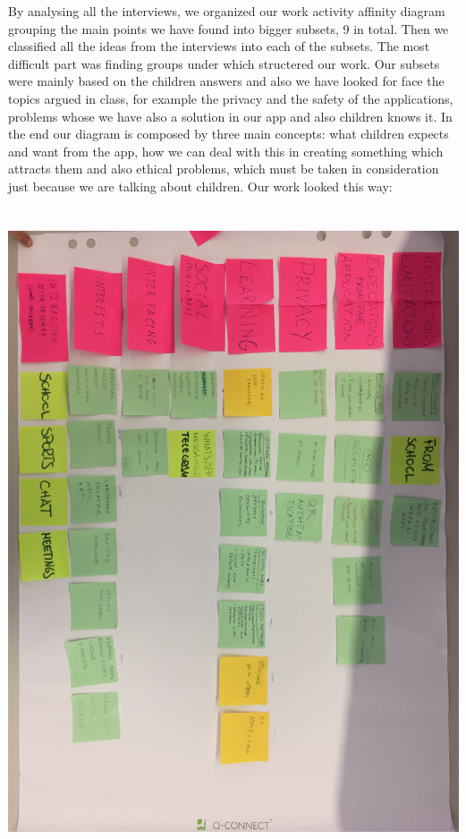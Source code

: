 \documentclass[12pt]{report}
\begin{document}
	By analysing all the interviews, we organized our work activity affinity diagram grouping the main points
	we have found into bigger subsets, 9 in total. Then we classified all the ideas
	from the interviews into each of the subsets. The most difficult part was finding groups under
	which structered our work. Our subsets were mainly based on the children
	answers and also we have looked for face the topics argued in class, for
	example the privacy and the safety of the applications, problems whose we
	have also a solution in our app and also children knows it. In the end our diagram
	is composed by three main concepts: what children expects and want from the app,
	how we can deal with this in creating something which attracts them and also ethical
	problems, which must be taken in consideration just because we are talking about
	children. Our work looked this way: \\\\\\
	\includegraphics[width = 1.0\linewidth]{affinity_diagram.jpg}\break
\end{document}
